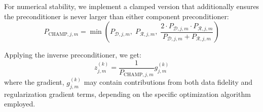 For numerical stability, we implement a clamped version that additionally ensures the preconditioner is never larger than either component preconditioner:
\[
    P_{\text{CHAMP},j,m} = \min\left(P_{\mathcal{D},j,m},\; P_{\mathcal{R},j,m},\; \frac{2 \cdot P_{\mathcal{D},j,m} \cdot P_{\mathcal{R},j,m}}{P_{\mathcal{D},j,m} + P_{\mathcal{R},j,m}}\right)
\]

Applying the inverse preconditioner, we get:
\[
    z^{(k)}_{j,m} = \frac{1}{P_{\text{CHAMP},j,m}} g_{j,m}^{(k)}
\]
where the gradient, $g_{j,m}^{(k)}$ may contain contributions from both data fidelity and regularization gradient terms, depending on the specific optimization algorithm employed.